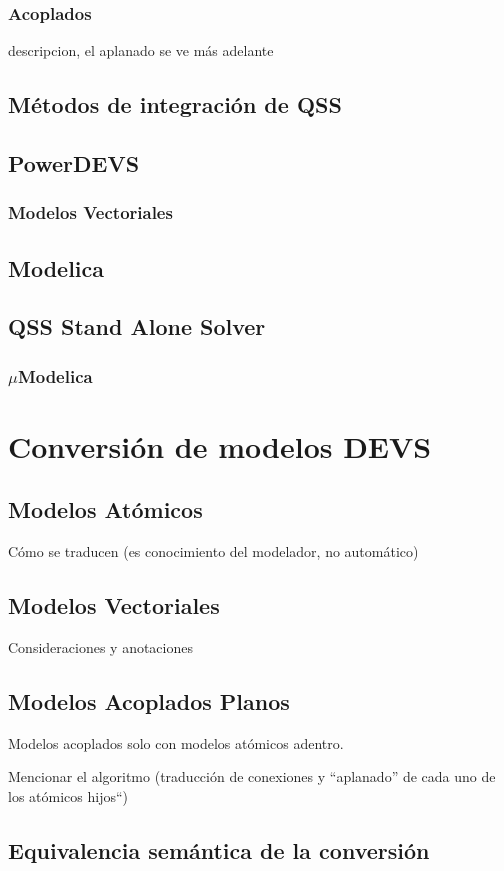 \documentclass[a4paper,	11pt]{article}
\begin{document}
\subsubsection{Acoplados}
	descripcion, el aplanado se ve más adelante
\subsection {Métodos de integración de QSS}
\subsection {PowerDEVS}
\subsubsection{Modelos Vectoriales}
\subsection{Modelica}
\subsection{QSS Stand Alone Solver}
\subsubsection{$\mu$Modelica}

\section{Conversión de modelos DEVS}
\subsection{Modelos Atómicos}
Cómo se traducen (es conocimiento del modelador, no automático)
\subsection{Modelos Vectoriales}
Consideraciones  y anotaciones

\subsection{Modelos Acoplados Planos}
Modelos acoplados solo con modelos atómicos adentro.

Mencionar el algoritmo (traducción de conexiones y ``aplanado'' de cada uno de los atómicos hijos``)	

\subsection{Equivalencia semántica de la conversión}
\end{document}
